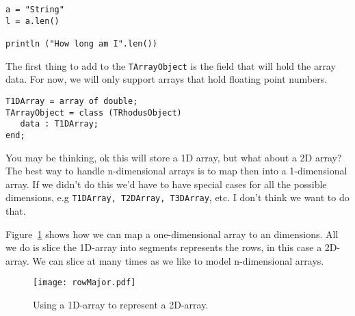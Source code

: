 \begin{lstlisting}
a = "String"
l = a.len()

println ("How long am I".len())
\end{lstlisting}

The first thing to add to the {\tt TArrayObject} is the field that will hold the array data. For now, we will only support arrays that hold floating point numbers.

\begin{lstlisting}
T1DArray = array of double;
TArrayObject = class (TRhodusObject)
   data : T1DArray;
end;
\end{lstlisting}

You may be thinking, ok this will store a 1D array, but what about a 2D array? The best way to handle n-dimensional arrays is to map then into a 1-dimensional array. If we didn't do this we'd have to have special cases for all the possible dimensions, e.g {\tt T1DArray, T2DArray, T3DArray}, etc. I don't think we want to do that.

Figure~\ref{fig:rowMajor} shows how we can map a one-dimensional array to an dimensions. All we do is slice the 1D-array into segments represents the rows, in this case a 2D-array. We can slice at many times as we like to model n-dimensional arrays.

\begin{figure}[htpb]
\centering
\texttt{[image: rowMajor.pdf]}
\caption{Using a 1D-array to represent a 2D-array.}
\label{fig:rowMajor}
\end{figure}

